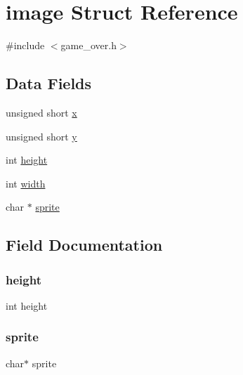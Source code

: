 \hypertarget{structimage}{}\section{image Struct Reference}
\label{structimage}


{\ttfamily \#include $<$game\+\_\+over.\+h$>$}

\subsection*{Data Fields}
\begin{DoxyCompactItemize}
\item 
unsigned short \hyperlink{structimage_a6762fe907d546b988585b308b1c304c2}{x}
\item 
unsigned short \hyperlink{structimage_a8c9c5ccb800d748c485dfe2b6fa2cd9e}{y}
\item 
int \hyperlink{structimage_ad12fc34ce789bce6c8a05d8a17138534}{height}
\item 
int \hyperlink{structimage_a2474a5474cbff19523a51eb1de01cda4}{width}
\item 
char $\ast$ \hyperlink{structimage_a6cffc5f58f86106ef1a6ea2f745efda1}{sprite}
\end{DoxyCompactItemize}


\subsection{Field Documentation}
\hypertarget{structimage_ad12fc34ce789bce6c8a05d8a17138534}{}\label{structimage_ad12fc34ce789bce6c8a05d8a17138534} 
\subsubsection{\texorpdfstring{height}{height}}
{\footnotesize\ttfamily int height}

\hypertarget{structimage_a6cffc5f58f86106ef1a6ea2f745efda1}{}\label{structimage_a6cffc5f58f86106ef1a6ea2f745efda1} 
\subsubsection{\texorpdfstring{sprite}{sprite}}
{\footnotesize\ttfamily char$\ast$ sprite}

\hypertarget{structimage_a2474a5474cbff19523a51eb1de01cda4}{}\label{structimage_a2474a5474cbff19523a51eb1de01cda4} 
